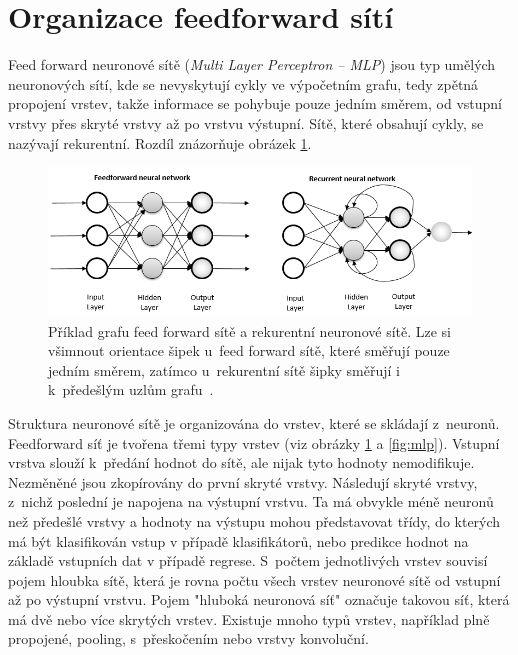 \section{Organizace feedforward sítí}
Feed forward neuronové sítě (\textit{Multi Layer Perceptron -- MLP}) jsou typ umělých neuronových sítí, kde se nevyskytují cykly ve výpočetním grafu, tedy zpětná propojení vrstev, takže informace se pohybuje pouze jedním směrem, od vstupní vrstvy přes skryté vrstvy až po vrstvu výstupní. Sítě, které obsahují cykly, se nazývají rekurentní. Rozdíl znázorňuje obrázek \ref{fig:netcomparison}.

\begin{figure}[H]
    \centering
    \includegraphics[scale=0.5]{obrazky-figures/feedforward_vs_recurrent.png}
    \caption{\label{fig:netcomparison}Příklad grafu feed forward sítě a rekurentní neuronové sítě. Lze si všimnout orientace šipek u~feed forward sítě, které směřují pouze jedním směrem, zatímco u~rekurentní sítě šipky směřují i k~předešlým uzlům grafu~\cite{FFandRecNN}.}
\end{figure}

Struktura neuronové sítě je organizována do vrstev, které se skládají z~neuronů. Feedforward síť je tvořena třemi typy vrstev (viz obrázky \ref{fig:netcomparison} a \ref{fig:mlp}). Vstupní vrstva slouží k~předání hodnot do sítě, ale nijak tyto hodnoty nemodifikuje. Nezměněné jsou zkopírovány do první skryté vrstvy. Následují skryté vrstvy, z~nichž poslední je napojena na výstupní vrstvu. Ta má obvykle méně neuronů než předešlé vrstvy a hodnoty na výstupu mohou představovat třídy, do kterých má být klasifikován vstup v případě klasifikátorů, nebo predikce hodnot na základě vstupních dat v případě regrese. S~počtem jednotlivých vrstev souvisí pojem hloubka sítě, která je rovna počtu všech vrstev neuronové sítě od vstupní až po výstupní vrstvu. Pojem  "hluboká neuronová síť" označuje takovou síť, která má dvě nebo více skrytých vrstev. Existuje mnoho typů vrstev, například plně propojené, pooling, s~přeskočením nebo vrstvy konvoluční.

